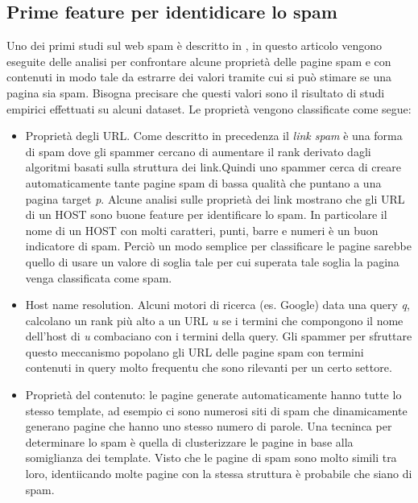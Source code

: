 \subsection{Prime feature per identidicare lo spam}
\label{subsec:Feature}
Uno dei primi studi sul web spam è descritto in \cite{Fetterly:2004:SDS:1017074.1017077}, in questo articolo vengono eseguite delle analisi per confrontare alcune proprietà delle pagine spam e con contenuti in modo tale da estrarre dei valori tramite cui si può stimare se una pagina sia spam. Bisogna precisare che questi valori sono il risultato di studi empirici effettuati su alcuni dataset. Le proprietà vengono classificate come segue:
\begin{itemize}
 \item 	Proprietà degli URL. Come descritto in precedenza il \textit{link spam} è una forma di spam dove gli spammer cercano di aumentare il rank derivato dagli algoritmi basati sulla struttura dei link.Quindi uno spammer cerca di creare automaticamente tante pagine spam di bassa qualità che puntano a una pagina target \textit{p}. Alcune analisi sulle proprietà dei link mostrano che gli URL di un HOST sono buone feature per identificare lo spam. In particolare il nome di un HOST con molti caratteri, punti, barre e numeri è un buon indicatore di spam. Perciò un modo semplice per classificare le pagine sarebbe quello di usare un valore di soglia tale per cui superata tale soglia la pagina venga classificata come spam. 
 
 \item Host name resolution. Alcuni motori di ricerca (es. Google) data una query \textit{q}, calcolano un rank più alto a un URL \textit{u} se i termini che compongono  il nome dell'host di \textit{u} combaciano con i termini della query. Gli spammer per sfruttare questo meccanismo popolano gli URL delle pagine spam con termini contenuti in query molto frequentu che sono rilevanti per un certo settore.
 
 \item Proprietà del contenuto: le pagine generate automaticamente hanno tutte lo stesso template, ad esempio ci sono numerosi siti di spam che dinamicamente generano pagine che hanno uno stesso numero di parole. Una tecninca per determinare lo spam è quella di clusterizzare le pagine in base alla somiglianza dei template. Visto che le pagine di spam sono molto simili tra loro, identiicando molte pagine con la stessa struttura è probabile che siano di spam.
\end{itemize}

